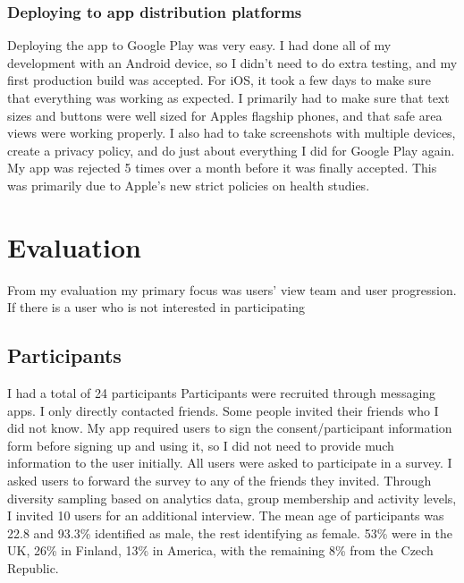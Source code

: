 \documentclass{l4proj}
\begin{document}
\subsection{Deploying to app distribution platforms}
Deploying the app to Google Play was very easy. I had done all of my development with an Android device, so I didn't need to do extra testing, and my first production build was accepted. For iOS, it took a few days to make sure that everything was working as expected. I primarily had to make sure that text sizes and buttons were well sized for Apples flagship phones, and that safe area views were working properly. I also had to take screenshots with multiple devices, create a privacy policy, and do just about everything I did for Google Play again. My app was rejected 5 times over a month before it was finally accepted. This was primarily due to Apple's new strict policies on health studies.

\chapter{Evaluation}
From my evaluation my primary focus was users' view team and user progression. If there is a user who is not interested in participating 

\section{Participants}
I had a total of 24 participants Participants were recruited through messaging apps. I only directly contacted friends. Some people invited their friends who I did not know. My app required users to sign the consent/participant information form before signing up and using it, so I did not need to provide much information to the user initially. All users were asked to participate in a survey. I asked users to forward the survey to any of the friends they invited. Through diversity sampling based on analytics data, group membership and activity levels, I invited 10 users for an additional interview. The mean age of participants was 22.8 and 93.3\% identified as male, the rest identifying as female. 53\% were in the UK, 26\% in Finland, 13\% in America, with the remaining 8\% from the Czech Republic. 
\end{document}
